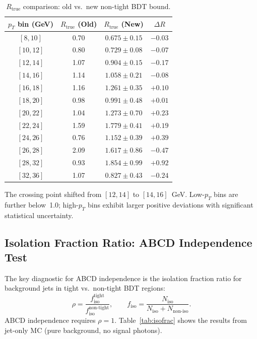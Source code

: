 \documentclass[11pt,a4paper]{article}
\begin{document}
\begin{table}[H]
\centering
\caption{$R_{\mathrm{true}}$ comparison: old vs.\ new non-tight BDT bound.}
\label{tab:rtrue_comparison}
\begin{tabular}{@{}cccc@{}}
\toprule
$p_T$ bin (GeV) & $R_{\mathrm{true}}$ (Old) & $R_{\mathrm{true}}$ (New) & $\Delta R$ \\
\midrule
$[8,10]$   & 0.70 & $0.675 \pm 0.15$  & $-0.03$ \\
$[10,12]$  & 0.80 & $0.729 \pm 0.08$  & $-0.07$ \\
$[12,14]$  & 1.07 & $0.904 \pm 0.15$  & $-0.17$ \\
$[14,16]$  & 1.14 & $1.058 \pm 0.21$  & $-0.08$ \\
$[16,18]$  & 1.16 & $1.261 \pm 0.35$  & $+0.10$ \\
$[18,20]$  & 0.98 & $0.991 \pm 0.48$  & $+0.01$ \\
$[20,22]$  & 1.04 & $1.273 \pm 0.70$  & $+0.23$ \\
$[22,24]$  & 1.59 & $1.779 \pm 0.41$  & $+0.19$ \\
$[24,26]$  & 0.76 & $1.152 \pm 0.39$  & $+0.39$ \\
$[26,28]$  & 2.09 & $1.617 \pm 0.86$  & $-0.47$ \\
$[28,32]$  & 0.93 & $1.854 \pm 0.99$  & $+0.92$ \\
$[32,36]$  & 1.07 & $0.827 \pm 0.43$  & $-0.24$ \\
\bottomrule
\end{tabular}
\end{table}

The crossing point shifted from $[12,14]$ to $[14,16]$~GeV. Low-$p_T$ bins
are further below~1.0; high-$p_T$ bins exhibit larger positive deviations
with significant statistical uncertainty.

\subsection{Isolation Fraction Ratio: ABCD Independence Test}
\label{sec:isofrac}

The key diagnostic for ABCD independence is the isolation fraction ratio
for background jets in tight vs.\ non-tight BDT regions:
\begin{equation}
\rho = \frac{f_{\mathrm{iso}}^{\mathrm{tight}}}{f_{\mathrm{iso}}^{\mathrm{non\text{-}tight}}},
\qquad f_{\mathrm{iso}} = \frac{N_{\mathrm{iso}}}{N_{\mathrm{iso}} + N_{\mathrm{non\text{-}iso}}}.
\end{equation}
ABCD independence requires $\rho = 1$. Table~\ref{tab:isofrac} shows
the results from jet-only MC (pure background, no signal photons).
\end{document}
